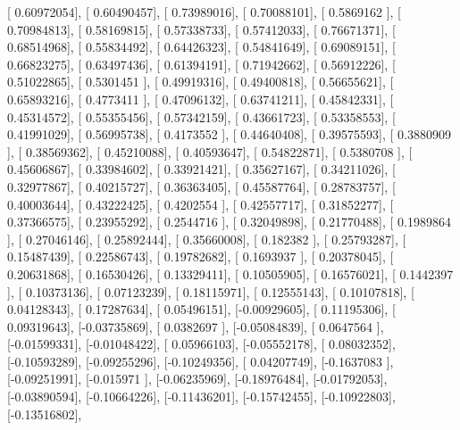 \documentclass{article}
\begin{document}
       [ 0.60972054],
       [ 0.60490457],
       [ 0.73989016],
       [ 0.70088101],
       [ 0.5869162 ],
       [ 0.70984813],
       [ 0.58169815],
       [ 0.57338733],
       [ 0.57412033],
       [ 0.76671371],
       [ 0.68514968],
       [ 0.55834492],
       [ 0.64426323],
       [ 0.54841649],
       [ 0.69089151],
       [ 0.66823275],
       [ 0.63497436],
       [ 0.61394191],
       [ 0.71942662],
       [ 0.56912226],
       [ 0.51022865],
       [ 0.5301451 ],
       [ 0.49919316],
       [ 0.49400818],
       [ 0.56655621],
       [ 0.65893216],
       [ 0.4773411 ],
       [ 0.47096132],
       [ 0.63741211],
       [ 0.45842331],
       [ 0.45314572],
       [ 0.55355456],
       [ 0.57342159],
       [ 0.43661723],
       [ 0.53358553],
       [ 0.41991029],
       [ 0.56995738],
       [ 0.4173552 ],
       [ 0.44640408],
       [ 0.39575593],
       [ 0.3880909 ],
       [ 0.38569362],
       [ 0.45210088],
       [ 0.40593647],
       [ 0.54822871],
       [ 0.5380708 ],
       [ 0.45606867],
       [ 0.33984602],
       [ 0.33921421],
       [ 0.35627167],
       [ 0.34211026],
       [ 0.32977867],
       [ 0.40215727],
       [ 0.36363405],
       [ 0.45587764],
       [ 0.28783757],
       [ 0.40003644],
       [ 0.43222425],
       [ 0.4202554 ],
       [ 0.42557717],
       [ 0.31852277],
       [ 0.37366575],
       [ 0.23955292],
       [ 0.2544716 ],
       [ 0.32049898],
       [ 0.21770488],
       [ 0.1989864 ],
       [ 0.27046146],
       [ 0.25892444],
       [ 0.35660008],
       [ 0.182382  ],
       [ 0.25793287],
       [ 0.15487439],
       [ 0.22586743],
       [ 0.19782682],
       [ 0.1693937 ],
       [ 0.20378045],
       [ 0.20631868],
       [ 0.16530426],
       [ 0.13329411],
       [ 0.10505905],
       [ 0.16576021],
       [ 0.1442397 ],
       [ 0.10373136],
       [ 0.07123239],
       [ 0.18115971],
       [ 0.12555143],
       [ 0.10107818],
       [ 0.04128343],
       [ 0.17287634],
       [ 0.05496151],
       [-0.00929605],
       [ 0.11195306],
       [ 0.09319643],
       [-0.03735869],
       [ 0.0382697 ],
       [-0.05084839],
       [ 0.0647564 ],
       [-0.01599331],
       [-0.01048422],
       [ 0.05966103],
       [-0.05552178],
       [ 0.08032352],
       [-0.10593289],
       [-0.09255296],
       [-0.10249356],
       [ 0.04207749],
       [-0.1637083 ],
       [-0.09251991],
       [-0.015971  ],
       [-0.06235969],
       [-0.18976484],
       [-0.01792053],
       [-0.03890594],
       [-0.10664226],
       [-0.11436201],
       [-0.15742455],
       [-0.10922803],
       [-0.13516802],
\end{document}
